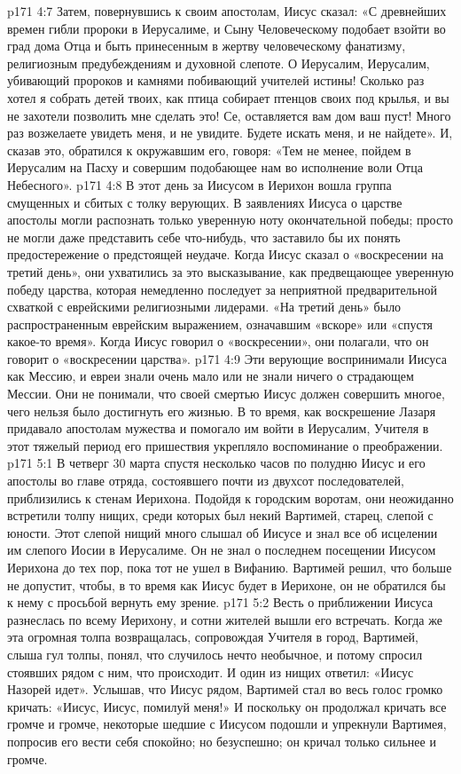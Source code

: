 \vs p171 4:7 Затем, повернувшись к своим апостолам, Иисус сказал: «С древнейших времен гибли пророки в Иерусалиме, и Сыну Человеческому подобает взойти во град дома Отца и быть принесенным в жертву человеческому фанатизму, религиозным предубеждениям и духовной слепоте. О Иерусалим, Иерусалим, убивающий пророков и камнями побивающий учителей истины! Сколько раз хотел я собрать детей твоих, как птица собирает птенцов своих под крылья, и вы не захотели позволить мне сделать это! Се, оставляется вам дом ваш пуст! Много раз возжелаете увидеть меня, и не увидите. Будете искать меня, и не найдете». И, сказав это, обратился к окружавшим его, говоря: «Тем не менее, пойдем в Иерусалим на Пасху и совершим подобающее нам во исполнение воли Отца Небесного».
\vs p171 4:8 \pc В этот день за Иисусом в Иерихон вошла группа смущенных и сбитых с толку верующих. В заявлениях Иисуса о царстве апостолы могли распознать только уверенную ноту окончательной победы; просто не могли даже представить себе что\hyp{}нибудь, что заставило бы их понять предостережение о предстоящей неудаче. Когда Иисус сказал о «воскресении на третий день», они ухватились за это высказывание, как предвещающее уверенную победу царства, которая немедленно последует за неприятной предварительной схваткой с еврейскими религиозными лидерами. «На третий день» было распространенным еврейским выражением, означавшим «вскоре» или «спустя какое\hyp{}то время». Когда Иисус говорил о «воскресении», они полагали, что он говорит о «воскресении царства».
\vs p171 4:9 Эти верующие воспринимали Иисуса как Мессию, и евреи знали очень мало или не знали ничего о страдающем Мессии. Они не понимали, что своей смертью Иисус должен совершить многое, чего нельзя было достигнуть его жизнью. В то время, как воскрешение Лазаря придавало апостолам мужества и помогало им войти в Иерусалим, Учителя в этот тяжелый период его пришествия укрепляло воспоминание о преображении.
\vs p171 5:1 В четверг 30 марта спустя несколько часов по полудню Иисус и его апостолы во главе отряда, состоявшего почти из двухсот последователей, приблизились к стенам Иерихона. Подойдя к городским воротам, они неожиданно встретили толпу нищих, среди которых был некий Вартимей, старец, слепой с юности. Этот слепой нищий много слышал об Иисусе и знал все об исцелении им слепого Иосии в Иерусалиме. Он не знал о последнем посещении Иисусом Иерихона до тех пор, пока тот не ушел в Вифанию. Вартимей решил, что больше не допустит, чтобы, в то время как Иисус будет в Иерихоне, он не обратился бы к нему с просьбой вернуть ему зрение.
\vs p171 5:2 Весть о приближении Иисуса разнеслась по всему Иерихону, и сотни жителей вышли его встречать. Когда же эта огромная толпа возвращалась, сопровождая Учителя в город, Вартимей, слыша гул толпы, понял, что случилось нечто необычное, и потому спросил стоявших рядом с ним, что происходит. И один из нищих ответил: «Иисус Назорей идет». Услышав, что Иисус рядом, Вартимей стал во весь голос громко кричать: «Иисус, Иисус, помилуй меня!» И поскольку он продолжал кричать все громче и громче, некоторые шедшие с Иисусом подошли и упрекнули Вартимея, попросив его вести себя спокойно; но безуспешно; он кричал только сильнее и громче.

